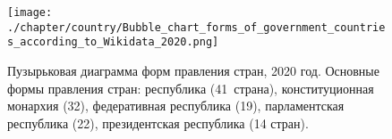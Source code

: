 \begin{figure*}
    \centering
    \texttt{[image: ./chapter/country/Bubble\_chart\_forms\_of\_government\_countries\_according\_to\_Wikidata\_2020.png]}
    \caption[Формы правления стран, 2020 год.]{Пузырьковая диаграмма форм правления стран, 2020 год.
	Основные формы правления стран: республика (41~страна), конституционная монархия (32), федеративная республика (19), парламентская республика (22), президентская республика (14 стран).} 
	\label{fig:bubble_chart_forms_of_government_countries_2020}%
\end{figure*} 




